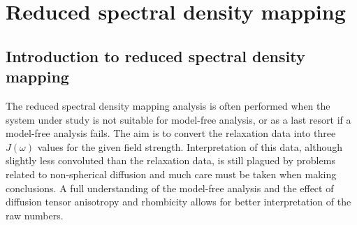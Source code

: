 


\chapter{Reduced spectral density mapping} \label{ch: J(w) mapping}


\section{Introduction to reduced spectral density mapping}

The reduced spectral density mapping analysis is often performed when the system under study is not suitable for model-free analysis, or as a last resort if a model-free analysis fails.
The aim is to convert the relaxation data into three $J(\omega)$ values for the given field strength.
Interpretation of this data, although slightly less convoluted than the relaxation data, is still plagued by problems related to non-spherical diffusion and much care must be taken when making conclusions.
A full understanding of the model-free analysis and the effect of diffusion tensor anisotropy and rhombicity allows for better interpretation of the raw numbers.

